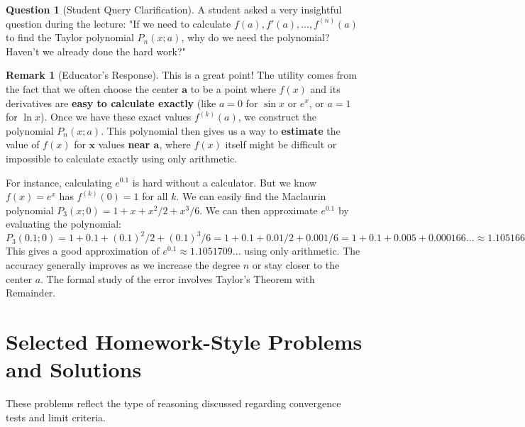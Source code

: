 \documentclass[11pt, a4paper]{article}
\theoremstyle{plain} %
\theoremstyle{definition} %
\newtheorem{remark}[theorem]{Remark}
\newtheorem{question}[theorem]{Question}
\begin{document}
\begin{question}[Student Query Clarification]\label{q:why_derivs}
A student asked a very insightful question during the lecture: "If we need to calculate $f(a), f'(a), \dots, f^{(n)}(a)$ to find the Taylor polynomial $P_n(x;a)$, why do we need the polynomial? Haven't we already done the hard work?"
\end{question}
\begin{remark}[Educator's Response]\label{rem:why_derivs_ans}
This is a great point! The utility comes from the fact that we often choose the center $\boldsymbol{a}$ to be a point where $f(x)$ and its derivatives are \textbf{easy to calculate exactly} (like $a=0$ for $\sin x$ or $e^x$, or $a=1$ for $\ln x$). Once we have these exact values $f^{(k)}(a)$, we construct the polynomial $P_n(x;a)$. This polynomial then gives us a way to \textbf{estimate} the value of $f(x)$ for $\boldsymbol{x}$ values \textbf{near $\boldsymbol{a}$}, where $f(x)$ itself might be difficult or impossible to calculate exactly using only arithmetic.

For instance, calculating $e^{0.1}$ is hard without a calculator. But we know $f(x)=e^x$ has $f^{(k)}(0)=1$ for all $k$. We can easily find the Maclaurin polynomial $P_3(x;0) = 1+x+x^2/2+x^3/6$. We can then approximate $e^{0.1}$ by evaluating the polynomial:
$P_3(0.1; 0) = 1 + 0.1 + (0.1)^2/2 + (0.1)^3/6 = 1 + 0.1 + 0.01/2 + 0.001/6 = 1 + 0.1 + 0.005 + 0.000166... \approx 1.105166...$
This gives a good approximation of $e^{0.1} \approx 1.1051709...$ using only arithmetic. The accuracy generally improves as we increase the degree $n$ or stay closer to the center $a$. The formal study of the error involves Taylor's Theorem with Remainder.
\end{remark}

\section{Selected Homework-Style Problems and Solutions}
These problems reflect the type of reasoning discussed regarding convergence tests and limit criteria.
\end{document}
